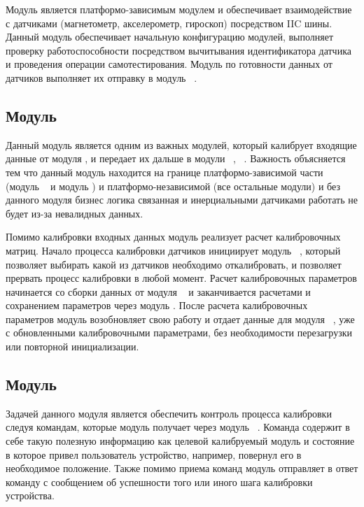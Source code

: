 Модуль \modulePerifery является платформо-зависимым модулем и обеспечивает взаимодействие с датчиками
(магнетометр, акселерометр, гироскоп) посредством IIC шины. Данный модуль обеспечивает начальную конфигурацию 
модулей, выполняет проверку работоспособности посредством вычитывания идентификатора датчика и проведения 
операции самотестирования. Модуль по готовности данных от датчиков выполняет их отправку в модуль \moduleCalib~.

\subsection{Модуль \moduleCalib}

Данный модуль является одним из важных модулей, который калибрует входящие данные от модуля \modulePerifery, и передает их дальше
в модули \moduleMoveDetect~, \moduleOrientationAzimuth~. Важность объясняется тем что данный модуль 
находится на границе платформо-зависимой части (модуль \modulePerifery~ и модуль \moduleFlashMemory) и платформо-независимой (все остальные модули) и 
без данного модуля бизнес логика связанная и инерциальными датчиками работать не будет из-за невалидных данных.

Помимо калибровки входных данных модуль реализует расчет калибровочных матриц. Начало процесса калибровки датчиков инициирует модуль \moduleCalibControl~,
который позволяет выбирать какой из датчиков необходимо откалибровать, и позволяет прервать процесс калибровки в любой момент. Расчет калибровочных 
параметров начинается со сборки данных от модуля \modulePerifery~ и заканчивается расчетами и сохранением параметров через модуль \moduleFlashMemory.
После расчета калибровочных параметров модуль возобновляет свою работу и отдает данные для модуля \moduleOrientationAzimuth~, \moduleMoveDetect
уже с обновленными калибровочными параметрами, без необходимости перезагрузки или повторной инициализации. 

\subsection{Модуль \moduleCalibControl}

Задачей данного модуля является обеспечить контроль процесса калибровки следуя командам, которые модуль получает
через модуль \moduleUart~. Команда содержит в себе такую полезную информацию как целевой калибруемый модуль и состояние 
в которое привел пользователь устройство, например, повернул его в необходимое положение. Также помимо приема команд 
модуль отправляет в ответ команду с сообщением об успешности того или иного шага калибровки устройства.

